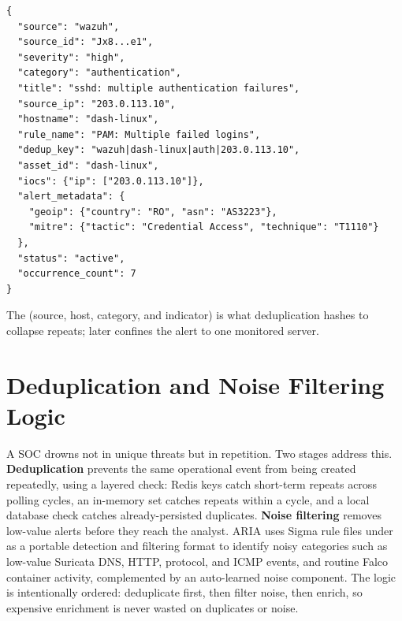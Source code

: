\begin{lstlisting}[style=aria,caption={Normalized and enriched alert (sanitized)},label={lst:normalized-alert},
  emph={source,source_id,severity,category,title,source_ip,hostname,rule_name,dedup_key,asset_id,iocs,alert_metadata,geoip,mitre,status,occurrence_count},
  emphstyle=\color{codekw}\bfseries]
{
  "source": "wazuh",
  "source_id": "Jx8...e1",
  "severity": "high",
  "category": "authentication",
  "title": "sshd: multiple authentication failures",
  "source_ip": "203.0.113.10",
  "hostname": "dash-linux",
  "rule_name": "PAM: Multiple failed logins",
  "dedup_key": "wazuh|dash-linux|auth|203.0.113.10",
  "asset_id": "dash-linux",
  "iocs": {"ip": ["203.0.113.10"]},
  "alert_metadata": {
    "geoip": {"country": "RO", "asn": "AS3223"},
    "mitre": {"tactic": "Credential Access", "technique": "T1110"}
  },
  "status": "active",
  "occurrence_count": 7
}
\end{lstlisting}

The  (source, host, category, and indicator) is what deduplication hashes to collapse repeats;  later confines the alert to one monitored server.

\section{Deduplication and Noise Filtering Logic}

A SOC drowns not in unique threats but in repetition. Two stages address this. \textbf{Deduplication} prevents the same operational event from being created repeatedly, using a layered check: Redis keys catch short-term repeats across polling cycles, an in-memory set catches repeats within a cycle, and a local database check catches already-persisted duplicates. \textbf{Noise filtering} removes low-value alerts before they reach the analyst. ARIA uses Sigma rule files under  as a portable detection and filtering format \cite{sigma} to identify noisy categories such as low-value Suricata DNS, HTTP, protocol, and ICMP events, and routine Falco container activity, complemented by an auto-learned noise component. The logic is intentionally ordered: deduplicate first, then filter noise, then enrich, so expensive enrichment is never wasted on duplicates or noise.

